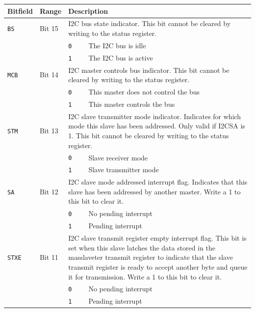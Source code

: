 \begin{tabularx}{\textwidth}{ l l l X }
\textbf{Bitfield} & \textbf{Range} & \multicolumn{2}{X}{\textbf{Description}} \\ \hline
\texttt{BS} & Bit 15 & \multicolumn{2}{X}{I2C bus state indicator. This bit cannot be cleared by writing to the status register.} \\
 & & \texttt{0} & The I2C bus is idle \\
 & & \cellcolor{tablehighlightcolor}\texttt{1} & \cellcolor{tablehighlightcolor}The I2C bus is active \\
\hline
\texttt{MCB} & Bit 14 & \multicolumn{2}{X}{I2C master controls bus indicator. This bit cannot be cleared by writing to the status register.} \\
 & & \texttt{0} & This master does not control the bus \\
 & & \cellcolor{tablehighlightcolor}\texttt{1} & \cellcolor{tablehighlightcolor}This master controls the bus \\
\hline
\texttt{STM} & Bit 13 & \multicolumn{2}{X}{I2C slave transmitter mode indicator. Indicates for which mode this slave has been addressed. Only valid if I2CSA is 1. This bit cannot be cleared by writing to the status register.} \\
 & & \texttt{0} & Slave receiver mode \\
 & & \cellcolor{tablehighlightcolor}\texttt{1} & \cellcolor{tablehighlightcolor}Slave transmitter mode \\
\hline
\texttt{SA} & Bit 12 & \multicolumn{2}{X}{I2C slave mode addressed interrupt flag. Indicates that this slave has been addressed by another master. Write a 1 to this bit to clear it.} \\
 & & \texttt{0} & No pending interrupt \\
 & & \cellcolor{tablehighlightcolor}\texttt{1} & \cellcolor{tablehighlightcolor}Pending interrupt \\
\hline
\texttt{STXE} & Bit 11 & \multicolumn{2}{X}{I2C slave transmit register empty interrupt flag. This bit is set when this slave latches the data stored in the masslaveter transmit register to indicate that the slave transmit register is ready to accept another byte and queue it for transmission. Write a 1 to this bit to clear it.} \\
 & & \texttt{0} & No pending interrupt \\
 & & \cellcolor{tablehighlightcolor}\texttt{1} & \cellcolor{tablehighlightcolor}Pending interrupt \\

\end{tabularx}
